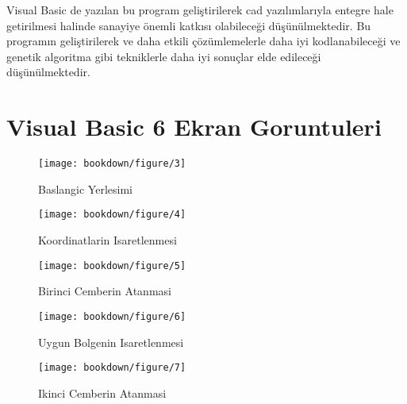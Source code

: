 \documentclass[]{book}
\begin{document}
Visual Basic de yazılan bu program geliştirilerek cad yazılımlarıyla entegre hale getirilmesi halinde sanayiye önemli katkısı olabileceği düşünülmektedir. Bu programın geliştirilerek ve daha etkili çözümlemelerle daha iyi kodlanabileceği ve genetik algoritma gibi tekniklerle daha iyi sonuçlar elde edileceği düşünülmektedir.

\hypertarget{visual-basic-6-ekran-goruntuleri}{%
\chapter{Visual Basic 6 Ekran Goruntuleri}\label{visual-basic-6-ekran-goruntuleri}}

\begin{figure}

{\centering \texttt{[image: bookdown/figure/3]} 

}

\caption{ Baslangic Yerlesimi}\label{fig:pressure3}
\end{figure}

\begin{figure}

{\centering \texttt{[image: bookdown/figure/4]} 

}

\caption{ Koordinatlarin Isaretlenmesi}\label{fig:pressure4}
\end{figure}

\begin{figure}

{\centering \texttt{[image: bookdown/figure/5]} 

}

\caption{ Birinci Cemberin Atanmasi}\label{fig:pressure5}
\end{figure}

\begin{figure}

{\centering \texttt{[image: bookdown/figure/6]} 

}

\caption{ Uygun Bolgenin Isaretlenmesi}\label{fig:pressure6}
\end{figure}

\begin{figure}

{\centering \texttt{[image: bookdown/figure/7]} 

}

\caption{ Ikinci Cemberin Atanmasi}\label{fig:pressure7}
\end{figure}
\end{document}
